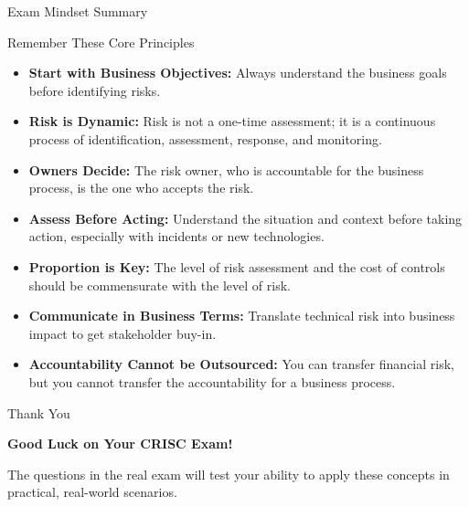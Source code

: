\documentclass[aspectratio=169]{beamer}
\begin{document}
	\begin{frame}{Exam Mindset Summary}
		\begin{block}{Remember These Core Principles}
			\begin{itemize}
				\item \textbf{Start with Business Objectives:} Always understand the business goals before identifying risks.
				\item \textbf{Risk is Dynamic:} Risk is not a one-time assessment; it is a continuous process of identification, assessment, response, and monitoring.
				\item \textbf{Owners Decide:} The risk owner, who is accountable for the business process, is the one who accepts the risk.
				\item \textbf{Assess Before Acting:} Understand the situation and context before taking action, especially with incidents or new technologies.
				\item \textbf{Proportion is Key:} The level of risk assessment and the cost of controls should be commensurate with the level of risk.
				\item \textbf{Communicate in Business Terms:} Translate technical risk into business impact to get stakeholder buy-in.
				\item \textbf{Accountability Cannot be Outsourced:} You can transfer financial risk, but you cannot transfer the accountability for a business process.
			\end{itemize}
		\end{block}
	\end{frame}
	
	\begin{frame}{Thank You}
		\begin{center}
			{\Huge \textbf{Good Luck on Your CRISC Exam!}}
			
			\vspace{1cm}
			
			\normalsize
			The questions in the real exam will test your ability to apply these concepts in practical, real-world scenarios.
		\end{center}
	\end{frame}
	
\end{document}

